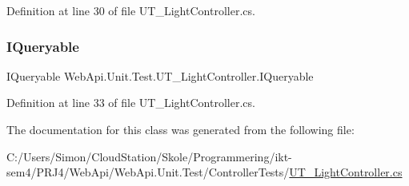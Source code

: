 Definition at line 30 of file U\+T\+\_\+\+Light\+Controller.\+cs.

\mbox{\label{class_web_api_1_1_unit_1_1_test_1_1_u_t___light_controller_ab9b42691bab59f14c340e39701aa29f1}} 
\subsubsection{\texorpdfstring{I\+Queryable}{IQueryable}}
{\footnotesize\ttfamily I\+Queryable Web\+Api.\+Unit.\+Test.\+U\+T\+\_\+\+Light\+Controller.\+I\+Queryable}



Definition at line 33 of file U\+T\+\_\+\+Light\+Controller.\+cs.



The documentation for this class was generated from the following file\+:\begin{DoxyCompactItemize}
\item 
C\+:/\+Users/\+Simon/\+Cloud\+Station/\+Skole/\+Programmering/ikt-\/sem4/\+P\+R\+J4/\+Web\+Api/\+Web\+Api.\+Unit.\+Test/\+Controller\+Tests/\mbox{\hyperlink{_u_t___light_controller_8cs}{U\+T\+\_\+\+Light\+Controller.\+cs}}\end{DoxyCompactItemize}
